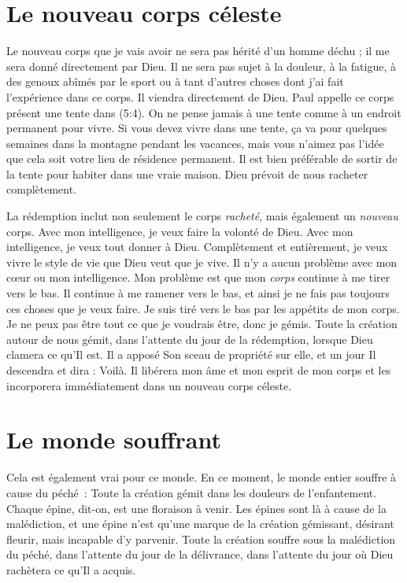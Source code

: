 \section{Le nouveau corps c\'eleste}

Le nouveau corps que je vais avoir ne sera pas hérité d'un homme déchu ;
 il me sera donné directement par Dieu.
 Il ne sera pas sujet à la douleur, à la fatigue, à des genoux abîmés
 par le sport ou à tant d'autres choses dont j'ai fait l'expérience
 dans ce corps. Il viendra directement de Dieu.
 Paul appelle ce corps présent une \og tente \fg{} dans (5:4).
 On ne pense jamais à une tente comme à un endroit permanent pour vivre.
 Si vous devez vivre dans une tente, ça va pour quelques semaines
 dans la montagne pendant les vacances, mais vous n'aimez pas l'idée
 que cela soit votre lieu de résidence permanent.
 Il est bien préférable de sortir de la tente pour habiter dans une vraie maison.
 Dieu prévoit de nous racheter complètement.

La rédemption inclut non seulement le corps \emph{racheté}, mais également
 un \emph{nouveau} corps. Avec mon intelligence, je veux faire la volonté de Dieu.
 Avec mon intelligence, je veux tout donner à Dieu.
 Complètement et entièrement, je veux vivre le style de vie que Dieu
 veut que je vive. Il n'y a aucun problème avec mon cœur ou mon intelligence.
 Mon problème est que mon \emph{corps} continue à me tirer vers le bas.
 Il continue à me ramener vers le bas, et ainsi je ne fais pas toujours
 ces choses que je veux faire. Je suis tiré vers le bas par les appétits
 de mon corps. Je ne peux pas être tout ce que je voudrais être,
 donc je gémis. Toute la création autour de nous gémit,
 dans l'attente du jour de la rédemption, lorsque Dieu clamera ce qu'Il est.
 Il a apposé Son sceau de propriété sur elle, et un jour Il descendra
 et dira : \og Voilà. \fg{}
 Il libérera mon âme et mon esprit de mon corps et les incorporera
 immédiatement dans un nouveau corps céleste.


\section{Le monde souffrant}

Cela est également vrai pour ce monde.
 En ce moment, le monde entier souffre à cause du péché~:
 \og Toute la création gémit dans les douleurs de l'enfantement. \fg{}
 Chaque épine, dit-on, est une floraison à venir.
 Les épines sont là à cause de la malédiction, et une épine n'est qu'une 
 marque de la création gémissant, désirant fleurir, mais incapable
 d'y parvenir. Toute la création souffre sous la malédiction du péché,
 dans l'attente du jour de la délivrance, dans l'attente du jour
 où Dieu rachètera ce qu'Il a acquis.

